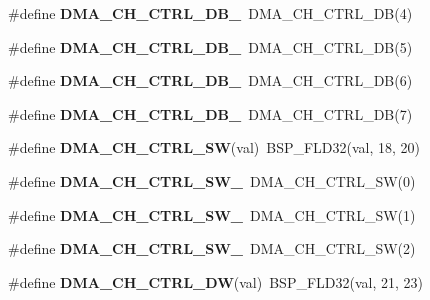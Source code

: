\begin{DoxyCompactItemize}
\#define {\bfseries D\+M\+A\+\_\+\+C\+H\+\_\+\+C\+T\+R\+L\+\_\+\+D\+B\+\_}~D\+M\+A\+\_\+\+C\+H\+\_\+\+C\+T\+R\+L\+\_\+\+DB(4)
\item 
\mbox{\label{group__lpc__dma_gaab1146444e58d0fa19fc5032526c22c2}} 
\#define {\bfseries D\+M\+A\+\_\+\+C\+H\+\_\+\+C\+T\+R\+L\+\_\+\+D\+B\+\_}~D\+M\+A\+\_\+\+C\+H\+\_\+\+C\+T\+R\+L\+\_\+\+DB(5)
\item 
\mbox{\label{group__lpc__dma_gace62f740759a48a7e5b0a51843e2772d}} 
\#define {\bfseries D\+M\+A\+\_\+\+C\+H\+\_\+\+C\+T\+R\+L\+\_\+\+D\+B\+\_}~D\+M\+A\+\_\+\+C\+H\+\_\+\+C\+T\+R\+L\+\_\+\+DB(6)
\item 
\mbox{\label{group__lpc__dma_ga3a96f40282cde0a0a4ca52112f3a22fb}} 
\#define {\bfseries D\+M\+A\+\_\+\+C\+H\+\_\+\+C\+T\+R\+L\+\_\+\+D\+B\+\_}~D\+M\+A\+\_\+\+C\+H\+\_\+\+C\+T\+R\+L\+\_\+\+DB(7)
\item 
\mbox{\label{group__lpc__dma_ga733fea535b6738c83d3b7d509535f812}} 
\#define {\bfseries D\+M\+A\+\_\+\+C\+H\+\_\+\+C\+T\+R\+L\+\_\+\+SW}(val)~B\+S\+P\+\_\+\+F\+L\+D32(val, 18, 20)
\item 
\mbox{\label{group__lpc__dma_gaa52e6fa94268523f4ae47c62273cc88f}} 
\#define {\bfseries D\+M\+A\+\_\+\+C\+H\+\_\+\+C\+T\+R\+L\+\_\+\+S\+W\+\_}~D\+M\+A\+\_\+\+C\+H\+\_\+\+C\+T\+R\+L\+\_\+\+SW(0)
\item 
\mbox{\label{group__lpc__dma_gac931a1874e3a40d10f0bc045b8669051}} 
\#define {\bfseries D\+M\+A\+\_\+\+C\+H\+\_\+\+C\+T\+R\+L\+\_\+\+S\+W\+\_}~D\+M\+A\+\_\+\+C\+H\+\_\+\+C\+T\+R\+L\+\_\+\+SW(1)
\item 
\mbox{\label{group__lpc__dma_gaa868116428c98a391bdeb42edf982b63}} 
\#define {\bfseries D\+M\+A\+\_\+\+C\+H\+\_\+\+C\+T\+R\+L\+\_\+\+S\+W\+\_}~D\+M\+A\+\_\+\+C\+H\+\_\+\+C\+T\+R\+L\+\_\+\+SW(2)
\item 
\mbox{\label{group__lpc__dma_ga85eafd1a3e861c61daa6af1f29bfb3b4}} 
\#define {\bfseries D\+M\+A\+\_\+\+C\+H\+\_\+\+C\+T\+R\+L\+\_\+\+DW}(val)~B\+S\+P\+\_\+\+F\+L\+D32(val, 21, 23)
\item 

\end{DoxyCompactItemize}
